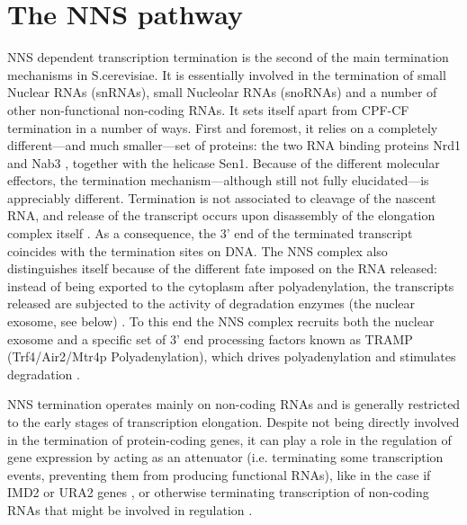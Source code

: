 
\clearpage

\section{The NNS pathway}

NNS dependent transcription termination is the second of the main termination mechanisms in S.cerevisiae. 
It is essentially involved in the termination of small Nuclear RNAs (snRNAs), small Nucleolar RNAs (snoRNAs) and a number of other non-functional non-coding RNAs.
It sets itself apart from CPF-CF termination in a number of ways.
First and foremost, it relies on a completely different---and much smaller---set of proteins: the two RNA binding proteins Nrd1 and Nab3 \cite{conrad:2000:yeast}, together with the helicase Sen1. 
Because of the different molecular effectors, the termination mechanism---although still not fully elucidated---is appreciably different. 
Termination is not associated to cleavage of the nascent RNA, and release of the transcript occurs upon disassembly of the elongation complex itself \cite{steinmetz:2001:rnabinding}. 
As a consequence, the 3’ end of the terminated transcript coincides with the termination sites on DNA. 
The NNS complex also distinguishes itself because of the different fate imposed on the RNA released: instead of being exported to the cytoplasm after polyadenylation, the transcripts released are subjected to the activity of degradation enzymes (the nuclear exosome, see below) \cite{vasiljeva:2006:nrd1}. 
To this end the NNS complex recruits both the nuclear exosome and a specific set of 3' end processing factors known as TRAMP (Trf4/Air2/Mtr4p Polyadenylation), which drives polyadenylation and stimulates degradation \cite{lacava:2005:rna, vasiljeva:2006:nrd1}.

NNS termination operates mainly on non-coding RNAs and is generally restricted to the early stages of transcription elongation. 
Despite not being directly involved in the termination of protein-coding genes, it can play a role in the regulation of gene expression by acting as an attenuator \cite{arigo:2006:regulation}(i.e. terminating some transcription events, preventing them from producing functional RNAs), like in the case if IMD2 or URA2 genes \citep{jenks:2008:properties}, or otherwise terminating transcription of non-coding RNAs that might be involved in regulation \cite{thompson:2007:cytoplasmic}.

